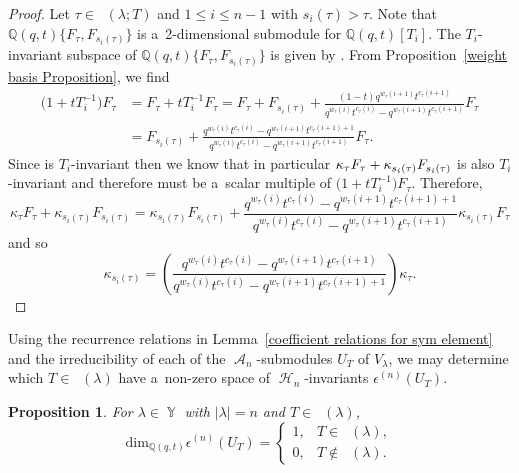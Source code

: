 \documentclass[10pt,a4paper]{amsart}
\numberwithin{equation}{section}
\newtheorem{Proposition}[Theorem]{Proposition}
\theoremstyle{definition}
\DeclareMathOperator{\Par}{\mathbb{Y}}
\DeclareMathOperator{\RYT}{\mathrm{RYT}_{\geq 0}}
\DeclareMathOperator{\PSYT}{\mathrm{PSYT}_{\geq 0}}
\DeclareMathOperator{\RSSYT}{\mathrm{RSSYT}_{\geq 0}}
\DeclareMathOperator{\sH}{\mathscr{H}}
\DeclareMathOperator{\sA}{\mathscr{A}}
\begin{document}
\begin{proof}
 Let $\tau \in \PSYT(\lambda;T)$ and $1 \leq i \leq n-1$ with $s_i(\tau) > \tau$. Note that $\mathbb{Q}(q,t)\{F_{\tau}, F_{s_i(\tau)}\}$ is a~2-dimensional submodule for $\mathbb{Q}(q,t)[T_i]$. The $T_i$-invariant subspace of $\mathbb{Q}(q,t)\{F_{\tau}, F_{s_i(\tau)}\}$ is given by . From Proposition~\ref{weight basis Proposition}, we find
 \begin{align*}
 \bigl(1+tT_{i}^{-1}\bigr)F_{\tau}& = F_{\tau} + tT_i^{-1}F_{\tau}
 = F_{\tau} + F_{s_i(\tau)} + \frac{(1-t)q^{w_{\tau}(i+1)}t^{c_{\tau}(i+1)}}{q^{w_{\tau}(i)}t^{c_{\tau}(i)}-q^{w_{\tau}(i+1)}t^{c_{\tau}(i+1)}} F_{\tau} \\
 & = F_{s_i(\tau)} + \frac{q^{w_{\tau}(i)}t^{c_{\tau}(i)}-q^{w_{\tau}(i+1)}t^{c_{\tau}(i+1)+1}}{q^{w_{\tau}(i)}t^{c_{\tau}(i)}-q^{w_{\tau}(i+1)}t^{c_{\tau}(i+1)}}F_{\tau}.
 \end{align*}
 Since \smash{$v = \sum_{\tau \in \PSYT(\lambda;T)} \kappa_{\tau}F_{\tau}$} is $T_i$-invariant then we know that in particular
 $\kappa_{\tau}F_{\tau}\allowbreak + \smash{\kappa_{s_i(\tau)}F_{s_i(\tau)}}$ is also $T_i$-invariant and therefore must be a~scalar multiple of $\bigl(1+tT_i^{-1}\bigr)F_{\tau}$. Therefore,
 \[
 \kappa_{\tau}F_{\tau} + \kappa_{s_i(\tau)}F_{s_i(\tau)} = \kappa_{s_i(\tau)}F_{s_i(\tau)} + \frac{q^{w_{\tau}(i)}t^{c_{\tau}(i)}-q^{w_{\tau}(i+1)}t^{c_{\tau}(i+1)+1}}{q^{w_{\tau}(i)}t^{c_{\tau}(i)}-q^{w_{\tau}(i+1)}t^{c_{\tau}(i+1)}}\kappa_{s_i(\tau)}F_{\tau}
 \]
 and so
 \[
 \kappa_{s_i(\tau)} = \left( \frac{q^{w_{\tau}(i)}t^{c_{\tau}(i)} - q^{w_{\tau}(i+1)}t^{c_{\tau}(i+1)}}{q^{w_{\tau}(i)}t^{c_{\tau}(i)} - q^{w_{\tau}(i+1)}t^{c_{\tau}(i+1)+1}} \right) \kappa_{\tau}.\tag*{\qed}
 \]\renewcommand{\qed}{}
\end{proof}

Using the recurrence relations in Lemma~\ref{coefficient relations for sym element} and the irreducibility of each of the $\sA_n$-sub\-modules $U_{T}$ of $V_{\lambda}$, we may determine which $T \in \RYT(\lambda)$ have a~non-zero space of $\sH_n$\nobreakdash-invariants $\epsilon^{(n)}(U_T)$.

\begin{Proposition}\label{sym AHA submodules}
 For $\lambda \in \Par$ with $|\lambda| = n$ and $T \in \RYT(\lambda)$,
 \[
 \mathrm{dim}_{\mathbb{Q}(q,t)} \epsilon^{(n)}(U_T) =\begin{cases}
 1 ,& T \in \RSSYT(\lambda),\\
 0, & T \notin \RSSYT(\lambda).
 \end{cases}
 \]

 \end{Proposition}
\end{document}
